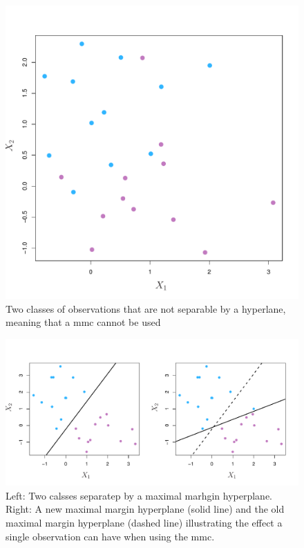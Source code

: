 \documentclass[11pt]{article}
\begin{document}
\begin{figure}[ht]
  \centering
  \includegraphics[width=12cm]{graphics/9_4.pdf}
  \caption{Two classes of observations that are not separable by a hyperlane, meaning that a \gls{mmc} cannot be used}
\end{figure}

\begin{figure}[ht]
  \centering
  \includegraphics[width=12cm]{graphics/9_5.pdf}
  \caption{Left: Two calsses separatep by a maximal marhgin hyperplane. Right: A new maximal margin hyperplane (solid line) and the old maximal margin hyperplane (dashed line) illustrating the effect a single observation can have when using the \gls{mmc}.}
\end{figure}
\end{document}
